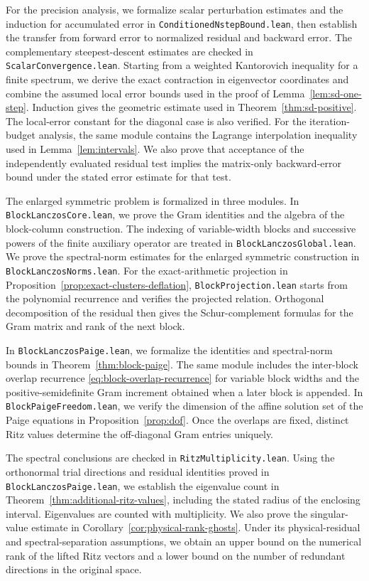\documentclass[11pt]{article}
\theoremstyle{definition}
\begin{document}
For the precision analysis, we formalize scalar perturbation estimates and
the induction for accumulated error in \texttt{ConditionedNstepBound.lean},
then establish the transfer from forward error to normalized residual and
backward error. The complementary steepest-descent estimates are checked
in \texttt{ScalarConvergence.lean}. Starting from a weighted Kantorovich
inequality for a finite spectrum, we derive the exact contraction in
eigenvector coordinates and combine the assumed local error bounds used in
the proof of Lemma~\ref{lem:sd-one-step}. Induction gives the geometric
estimate used in Theorem~\ref{thm:sd-positive}. The local-error constant for
the diagonal case is also verified. For the iteration-budget analysis, the same module
contains the Lagrange interpolation inequality used in Lemma~\ref{lem:intervals}.
We also prove that acceptance of the independently evaluated residual
test implies the matrix-only backward-error bound under the stated error
estimate for that test.

The enlarged symmetric problem is formalized in three modules.
In \texttt{BlockLanczosCore.lean}, we prove the Gram identities and the
algebra of the block-column construction. The indexing of variable-width
blocks and successive powers of the finite auxiliary operator are treated
in \texttt{BlockLanczosGlobal.lean}. We prove the spectral-norm estimates
for the enlarged symmetric construction in \texttt{BlockLanczosNorms.lean}.
For the exact-arithmetic projection in
Proposition~\ref{prop:exact-clusters-deflation},
\texttt{BlockProjection.lean} starts from the polynomial recurrence and
verifies the projected relation. Orthogonal decomposition of the residual
then gives the Schur-complement formulas for the Gram matrix and rank of
the next block.

In \texttt{BlockLanczosPaige.lean}, we formalize the identities and
spectral-norm bounds in Theorem~\ref{thm:block-paige}.
The same module includes the inter-block
overlap recurrence \eqref{eq:block-overlap-recurrence} for variable block
widths and the positive-semidefinite Gram increment obtained when a later
block is appended.
In \texttt{BlockPaigeFreedom.lean}, we verify the dimension of the affine
solution set of the Paige equations in Proposition~\ref{prop:dof}.
Once the overlaps are fixed, distinct Ritz values determine the
off-diagonal Gram entries uniquely.

The spectral conclusions are checked in \texttt{RitzMultiplicity.lean}.
Using the orthonormal trial directions and residual identities proved in
\texttt{BlockLanczosPaige.lean}, we establish the eigenvalue count in
Theorem~\ref{thm:additional-ritz-values}, including the stated radius of the
enclosing interval. Eigenvalues are counted with multiplicity.
We also prove the singular-value estimate in
Corollary~\ref{cor:physical-rank-ghosts}. Under its physical-residual and
spectral-separation assumptions, we obtain an upper bound on the numerical
rank of the lifted Ritz vectors and a lower bound on the number of
redundant directions in the original space.
\end{document}

